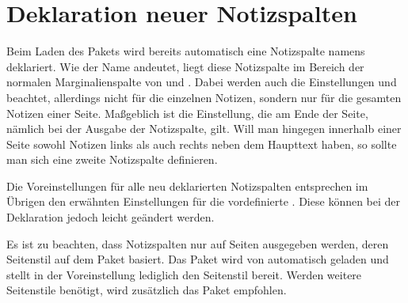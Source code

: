 
\section{Deklaration neuer Notizspalten}

Beim Laden des Pakets wird bereits automatisch eine Notizspalte namens
 deklariert. Wie der Name andeutet, liegt diese Notizspalte
im Bereich der normalen Marginalienspalte von 
und . Dabei werden auch die Einstellungen
 und  beachtet, allerdings
nicht für die einzelnen Notizen, sondern nur für die gesamten Notizen einer
Seite. Maßgeblich ist die Einstellung, die am Ende der Seite, nämlich
bei der Ausgabe der Notizspalte, gilt. Will man hingegen innerhalb einer Seite
sowohl Notizen links als auch rechts neben dem Haupttext haben, so sollte man
sich eine zweite Notizspalte definieren.

Die Voreinstellungen für alle neu deklarierten Notizspalten entsprechen im
Übrigen \iffree{}{\pagebreak}%
den erwähnten Einstellungen für die vordefinierte
. %
\iftrue%
Diese können bei der Deklaration jedoch leicht geändert werden.%
\fi

Es ist zu beachten, dass Notizspalten nur auf Seiten
ausgegeben werden, deren Seitenstil auf dem Paket
\hyperref[cha:scrlayer]{}%
 basiert. Das Paket
\hyperref[cha:scrlayer]{} wird von
 automatisch geladen und stellt in der
Voreinstellung lediglich den Seitenstil
 bereit. Werden weitere Seitenstile
benötigt, wird zusätzlich das Paket
\hyperref[cha:scrlayer-scrpage]{}%
%
empfohlen.

